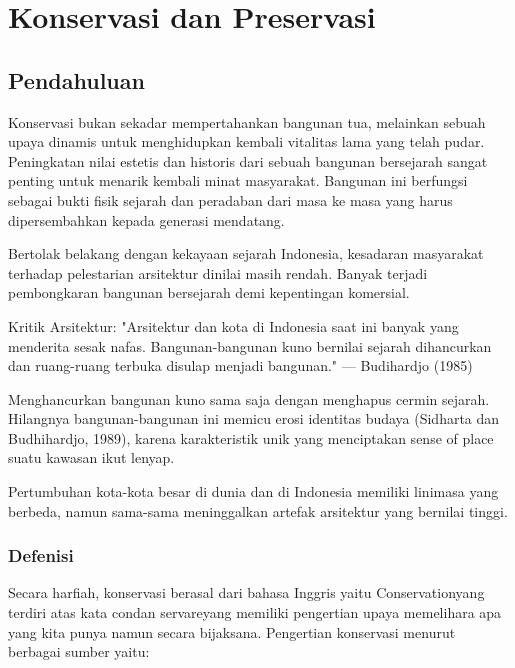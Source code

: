 \documentclass[../rumukota.tex]{subfiles}
\begin{document}
\section{Konservasi dan Preservasi}%
\label{sec:section name}

\subsection{Pendahuluan}%
\label{sub:Pendahuluan}

Konservasi bukan sekadar mempertahankan bangunan tua, melainkan sebuah upaya dinamis untuk menghidupkan kembali vitalitas lama yang telah pudar. Peningkatan nilai estetis dan historis dari sebuah bangunan bersejarah sangat penting untuk menarik kembali minat masyarakat. Bangunan ini berfungsi sebagai bukti fisik sejarah dan peradaban dari masa ke masa yang harus dipersembahkan kepada generasi mendatang.

Bertolak belakang dengan kekayaan sejarah Indonesia, kesadaran masyarakat terhadap pelestarian arsitektur dinilai masih rendah. Banyak terjadi pembongkaran bangunan bersejarah demi kepentingan komersial.

Kritik Arsitektur:
"Arsitektur dan kota di Indonesia saat ini banyak yang menderita sesak nafas. Bangunan-bangunan kuno bernilai sejarah dihancurkan dan ruang-ruang terbuka disulap menjadi bangunan."
— Budihardjo (1985)

Menghancurkan bangunan kuno sama saja dengan menghapus cermin sejarah. Hilangnya bangunan-bangunan ini memicu erosi identitas budaya (Sidharta dan Budhihardjo, 1989), karena karakteristik unik yang menciptakan sense of place suatu kawasan ikut lenyap.

Pertumbuhan kota-kota besar di dunia dan di Indonesia memiliki linimasa yang berbeda, namun sama-sama meninggalkan artefak arsitektur yang bernilai tinggi.

\subsubsection{Defenisi}%
\label{ssub:Defenisi}


Secara harfiah, konservasi berasal dari bahasa Inggris yaitu Conservationyang terdiri atas kata condan servareyang memiliki pengertian upaya memelihara apa yang kita punya namun secara bijaksana. Pengertian konservasi menurut berbagai sumber yaitu:
\end{document}
